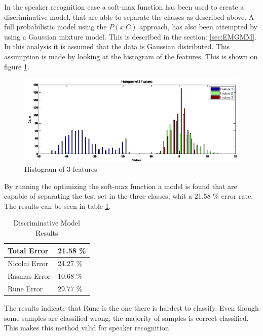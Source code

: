 In the speaker recognition case a soft-max function has been used to create a discriminative model, that are able to separate the classes as described above. A full probabilistic model using the $P(x|C)$ approach, has also been attempted by using a Gaussian mixture model. This is described in the section: \ref{sec:EMGMM}. In this analysis it is assumed that the data is Gaussian distributed. This assumption is made by looking at the histogram of the features. This is shown on figure \ref{fig:featurehist}.

\begin{figure}[H]
\centering
\includegraphics[scale=0.6]{billeder/histoffeature}
\caption{Histogram of 3 features}
\label{fig:featurehist}
\end{figure}

By running the optimizing the soft-max function a model is found that are capable of separating the test set in the three classes, whit a 21.58 \% error rate. The results can be seen in table \ref{tab:resultTableProp}. 

\begin{table}[h]
\centering
\begin{tabular}{ll}
\hline
Total Error   & 21.58 \% \\ \hline
Nicolai Error & 24.27 \% \\
Rasmus Error  & 10.68 \% \\
Rune Error    & 29.77 \% \\ \hline
\end{tabular}
\caption{Discriminative Model Results}
\label{tab:resultTableProp}
\end{table}

The results indicate that Rune is the one there is hardest to classify. Even though some samples are classified wrong, the majority of samples is correct classified. This makes this method valid for speaker recognition. \\
\ \\



